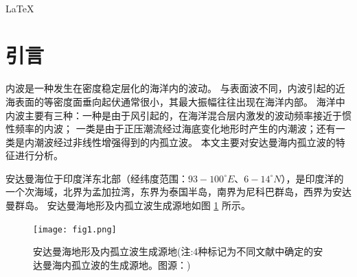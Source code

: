 \documentclass[10.5pt,compsoc,UTF8]{CjC}
\begin{document}
\setpage

\Title{\themytitle}{\themyauthor}{\themystudentid}

\myabstract{

}
\vspace {5mm}


\vskip 45mm

\begin{center}
\\
\vspace {5mm}

\end{center}

\vspace {5mm}
{\quad LaTeX}


\clearpage
\section{引言}
内波是一种发生在密度稳定层化的海洋内的波动\cite{Liang2016}。
与表面波不同，内波引起的近海表面的等密度面垂向起伏通常很小，其最大振幅往往出现在海洋内部\cite{}。
海洋中内波主要有三种：一种是由于风引起的，在海洋混合层内激发的波动频率接近于惯性频率的内波\cite{}；
一类是由于正压潮流经过海底变化地形时产生的内潮波；还有一类是内潮波经过非线性增强得到的内孤立波\cite{}。
本文主要对安达曼海内孤立波的特征进行分析。

安达曼海位于印度洋东北部（经纬度范围：$ 93 - 100^\circ E $、$ 6 - 14^\circ N $），是印度洋的一个次海域，北界为孟加拉湾，东界为泰国半岛，南界为尼科巴群岛，西界为安达曼群岛\cite{}。
安达曼海地形及内孤立波生成源地如图 \ref{fig:1} 所示。
\begin{figure}[!htbp]
    \centering
    \texttt{[image: fig1.png]}
    \caption{安达曼海地形及内孤立波生成源地(注:4种标记为不同文献中确定的安达曼海内孤立波的生成源地。图源：\cite{Zhang2024})}
    \label{fig:1}
\end{figure}

\end{document}

